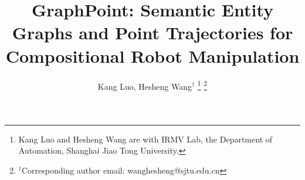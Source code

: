 \documentclass[letterpaper,10pt,conference]{ieeeconf}
\title{GraphPoint: Semantic Entity Graphs and Point Trajectories for Compositional Robot Manipulation}
\author{
Kang Luo, Hesheng Wang$^\dagger$
\thanks{Kang Luo and Hesheng Wang are with IRMV Lab, the Department of Automation, Shanghai Jiao Tong University.}
\thanks{$^\dagger$Corresponding author email: wanghesheng@sjtu.edu.cn}
}
\begin{document}
\maketitle







\FloatBarrier




\end{document}
